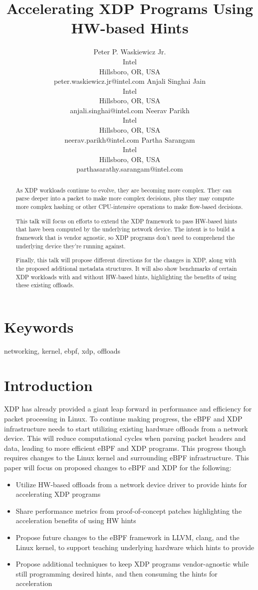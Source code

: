 \documentclass[letterpaper]{article}
\title{Accelerating XDP Programs Using HW-based Hints}
\author{Peter P. Waskiewicz Jr. \\ Intel \\ Hillsboro, OR, USA \\ peter.waskiewicz.jr@intel.com
\And Anjali Singhai Jain \\ Intel \\ Hillsboro, OR, USA \\ anjali.singhai@intel.com
\And Neerav Parikh \\ Intel \\ Hillsboro, OR, USA \\ neerav.parikh@intel.com
\And Partha Sarangam \\ Intel \\ Hillsboro, OR, USA \\ parthasarathy.sarangam@intel.com
\newline
\newline
}
\begin{document}
 
\maketitle
\begin{abstract}
As XDP workloads continue to evolve, they are becoming more complex.  They can parse deeper into a packet to make more complex decisions, plus they may compute more complex hashing or other CPU-intensive operations to make flow-based decisions.

This talk will focus on efforts to extend the XDP framework to pass HW-based hints that have been computed by the underlying network device.  The intent is to build a framework that is vendor agnostic, so XDP programs don't need to comprehend the underlying device they're running against.

Finally, this talk will propose different directions for the changes in XDP, along with the proposed additional metadata structures.  It will also show benchmarks of certain XDP workloads with and without HW-based hints, highlighting the benefits of using these existing offloads.
\end{abstract}

\section{Keywords}

networking, kernel, ebpf, xdp, offloads

\section{Introduction}
XDP has already provided a giant leap forward in performance and efficiency for packet processing in Linux. To continue making progress, the eBPF and XDP infrastructure needs to start utilizing existing hardware offloads from a network device. This will reduce computational cycles when parsing packet headers and data, leading to more efficient eBPF and XDP programs. This progress though requires changes to the Linux kernel and surrounding eBPF infrastructure.
\newline
\newline
This paper will focus on proposed changes to eBPF and XDP for the following:
\begin{itemize}
\item Utilize HW-based offloads from a network device driver to provide hints for accelerating XDP programs
\item Share performance metrics from proof-of-concept patches highlighting the acceleration benefits of using HW hints
\item Propose future changes to the eBPF framework in LLVM, clang, and the Linux kernel, to support teaching underlying hardware which hints to provide
\item Propose additional techniques to keep XDP programs vendor-agnostic while still programming desired hints, and then consuming the hints for acceleration
\end{itemize}
\end{document}
